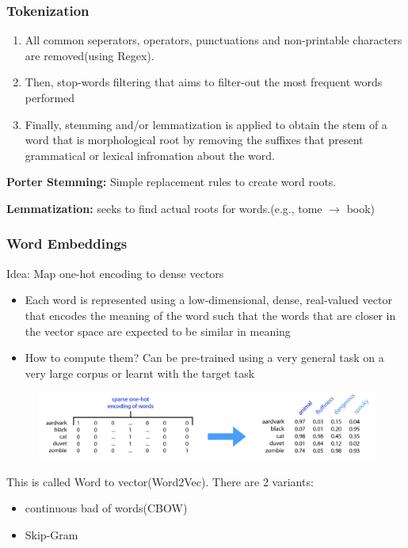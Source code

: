 \subsubsection{Tokenization}
\begin{enumerate}
    \item All common seperators, operators, punctuations and non-printable characters are removed(using Regex).
    \item Then, stop-words filtering that aims to filter-out the most frequent words performed
    \item Finally, stemming and/or lemmatization is applied to obtain the stem of a word that is morphological root by removing the suffixes that present grammatical or lexical infromation about the word.
\end{enumerate}
\textbf{Porter Stemming:} Simple replacement rules to create word roots.

\textbf{Lemmatization:} seeks to find actual roots for words.(e.g., tome \(\rightarrow\) book)
\subsubsection{Word Embeddings}
Idea: Map one-hot encoding to dense vectors
\begin{itemize}
    \item Each word is represented using a low-dimensional, dense, real-valued vector that encodes the meaning of the word such that the words that are closer in the vector space are expected to be similar in meaning
    \item How to compute them? Can be pre-trained using a very general task on a very large corpus or learnt with the target task
\end{itemize}
\begin{figure}
    \includegraphics[width = \columnwidth]{figures/07/TextEmbeddings.png}
\end{figure}
This is called Word to vector(Word2Vec).
There are 2 variants:
\begin{itemize}
    \item continuous bad of words(CBOW)
    \item Skip-Gram
\end{itemize}
